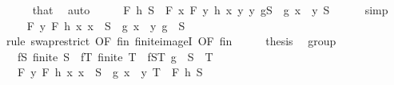 \begin{isabellebody}
\ \ \ \ \isamarkupfalse%
\ that\ \isamarkupfalse%
\ auto\isanewline
\ \ \isamarkupfalse%
\ \isamarkupfalse%
\ {\isachardoublequoteopen}F\ h\ S\ {\isacharequal}{\kern0pt}\ F\ {\isacharparenleft}{\kern0pt}{\isasymlambda}x{\isachardot}{\kern0pt}\ F\ {\isacharparenleft}{\kern0pt}{\isasymlambda}y{\isachardot}{\kern0pt}\ h\ x{\isacharparenright}{\kern0pt}\ {\isacharbraceleft}{\kern0pt}y{\isachardot}{\kern0pt}\ y{\isasymin}\ g{\isacharbackquote}{\kern0pt}S\ {\isasymand}\ g\ x\ {\isacharequal}{\kern0pt}\ y{\isacharbraceright}{\kern0pt}{\isacharparenright}{\kern0pt}\ S{\isachardoublequoteclose}\isanewline
\ \ \ \ \isamarkupfalse%
\ simp\isanewline
\ \ \isamarkupfalse%
\ \isamarkupfalse%
\ {\isachardoublequoteopen}{\isasymdots}\ {\isacharequal}{\kern0pt}\ F\ {\isacharparenleft}{\kern0pt}{\isasymlambda}y{\isachardot}{\kern0pt}\ F\ h\ {\isacharbraceleft}{\kern0pt}x{\isachardot}{\kern0pt}\ x\ {\isasymin}\ S\ {\isasymand}\ g\ x\ {\isacharequal}{\kern0pt}\ y{\isacharbraceright}{\kern0pt}{\isacharparenright}{\kern0pt}\ {\isacharparenleft}{\kern0pt}g\ {\isacharbackquote}{\kern0pt}\ S{\isacharparenright}{\kern0pt}{\isachardoublequoteclose}\isanewline
\ \ \ \ \isamarkupfalse%
\ {\isacharparenleft}{\kern0pt}rule\ swap{\isacharunderscore}{\kern0pt}restrict\ {\isacharbrackleft}{\kern0pt}OF\ fin\ finite{\isacharunderscore}{\kern0pt}imageI\ {\isacharbrackleft}{\kern0pt}OF\ fin{\isacharbrackright}{\kern0pt}{\isacharbrackright}{\kern0pt}{\isacharparenright}{\kern0pt}\isanewline
\ \ \isamarkupfalse%
\ \isamarkupfalse%
\ {\isacharquery}{\kern0pt}thesis\ \isacommand{{\isachardot}{\kern0pt}}\isamarkupfalse%
\isanewline
{}\isamarkupfalse%
%
\endisatagproof
{\isafoldproof}%
%
\isadelimproof
\isanewline
%
\endisadelimproof
\isanewline
{}\isamarkupfalse%
\ group{\isacharcolon}{\kern0pt}\isanewline
\ \ \ fS{\isacharcolon}{\kern0pt}\ {\isachardoublequoteopen}finite\ S{\isachardoublequoteclose}\ \ fT{\isacharcolon}{\kern0pt}\ {\isachardoublequoteopen}finite\ T{\isachardoublequoteclose}\ \ fST{\isacharcolon}{\kern0pt}\ {\isachardoublequoteopen}g\ {\isacharbackquote}{\kern0pt}\ S\ {\isasymsubseteq}\ T{\isachardoublequoteclose}\isanewline
\ \ \ {\isachardoublequoteopen}F\ {\isacharparenleft}{\kern0pt}{\isasymlambda}y{\isachardot}{\kern0pt}\ F\ h\ {\isacharbraceleft}{\kern0pt}x{\isachardot}{\kern0pt}\ x\ {\isasymin}\ S\ {\isasymand}\ g\ x\ {\isacharequal}{\kern0pt}\ y{\isacharbraceright}{\kern0pt}{\isacharparenright}{\kern0pt}\ T\ {\isacharequal}{\kern0pt}\ F\ h\ S{\isachardoublequoteclose}\isanewline

\end{isabellebody}
